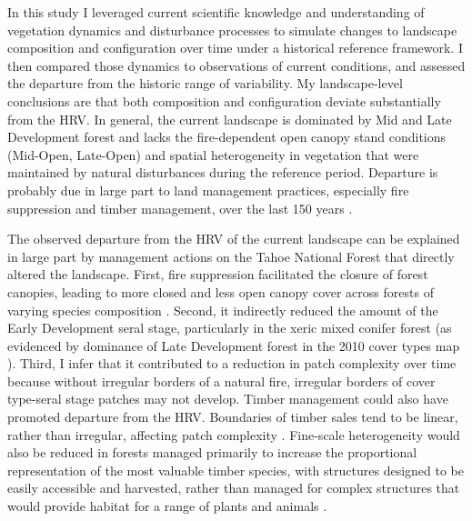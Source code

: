 

In this study I leveraged current scientific knowledge and understanding of vegetation dynamics and disturbance processes to simulate changes to landscape composition and configuration over time under a historical reference framework. I then compared those dynamics to observations of current conditions, and assessed the departure from the historic range of variability. My landscape-level conclusions are that both composition and configuration deviate substantially from the HRV. In general, the current landscape is dominated by Mid and Late Development forest and lacks the fire-dependent open canopy stand conditions (Mid-Open, Late-Open) and spatial heterogeneity in vegetation that were maintained by natural disturbances during the reference period. Departure is probably due in large part to land management practices, especially fire suppression and timber management, over the last 150 years \citep{Stephens2007,Safford2014}. 

The observed departure from the HRV of the current landscape can be explained in large part by management actions on the Tahoe National Forest that directly altered the landscape. First, fire suppression facilitated the closure of forest canopies, leading to more closed and less open canopy cover across forests of varying species composition \citep{Beaty2007}. Second, it indirectly reduced the amount of the Early Development seral stage, particularly in the xeric mixed conifer forest (as evidenced by dominance of Late Development forest in the 2010 cover types map \citep{USDAForestService2009}). Third, I infer that it contributed to a reduction in patch complexity over time because without irregular borders of a natural fire, irregular borders of cover type-seral stage patches may not develop. Timber management could also have promoted departure from the HRV. Boundaries of timber sales tend to be linear, rather than irregular, affecting patch complexity \citep{USDAForestService2012}. Fine-scale heterogeneity would also be reduced in forests managed primarily to increase the proportional representation of the most valuable timber species, with structures designed to be easily accessible and harvested, rather than managed for complex structures that would provide habitat for a range of plants and animals \citep{Franklin2002}. 


